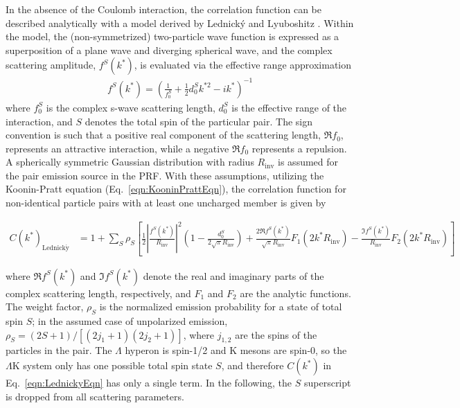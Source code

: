 \documentclass[ALICE,manyauthors]{cernphprep}
\newcommand{\Lam}{$\Lambda$\xspace}
\newcommand{\LamK}{$\Lambda$K\xspace}
\begin{document}
In the absence of the Coulomb interaction, the correlation function can be described analytically with a model derived by Lednick\'y and Lyuboshitz \cite{Lednicky:82}.
Within the model, the (non-symmetrized) two-particle wave function is expressed as a superposition of a plane wave and diverging spherical wave, and the complex scattering amplitude, $f^{S}(k^{*})$, is evaluated via the effective range approximation
\begin{equation}
\begin{aligned}
f^{S}(k^{*}) = \left( \frac{1}{f^{S}_{0}} + \frac{1}{2}d^{S}_{0}k^{*2} - ik^{*} \right)^{-1}
\end{aligned}
\label{eqn:ScatteringParam}
\end{equation}
where $f^{S}_{0}$ is the complex s-wave scattering length, $d^{S}_{0}$ is the effective range of the interaction, and $S$ denotes the total spin of the particular pair.
The sign convention is such that a positive real component of the scattering length, $\Re f_{0}$, represents an attractive interaction, while a negative $\Re f_{0}$ represents a repulsion.
A spherically symmetric Gaussian distribution with radius $R_{\mathrm{inv}}$  is assumed for the pair emission source in the PRF.
With these assumptions, utilizing the Koonin-Pratt equation (Eq.\ \ref{eqn:KooninPrattEqn}), the correlation function for non-identical particle pairs with at least one uncharged member is given by \cite{Lednicky:82}

\begin{equation}
\begin{aligned}
C(k^{*})_{\mathrm{Lednick\acute{y}}} &= 1 + \sum_{S}\rho_{S}\left[\frac{1}{2}\left|\frac{f^{S}(k^{*})}{R_{\mathrm{inv}}}\right|^2\left(1-\frac{d^{S}_{0}}{2\sqrt{\pi}R_{\mathrm{inv}}}\right)+\frac{2\Re f^{S}(k^{*})}{\sqrt{\pi}R_{\mathrm{inv}}}F_{1}(2k^{*}R_{\mathrm{inv}})-\frac{\Im f^{S}(k^{*})}{R_{\mathrm{inv}}}F_{2}(2k^{*}R_{\mathrm{inv}})\right]
\end{aligned}  
\label{eqn:LednickyEqn}
\end{equation}

where $\Re f^{S}(k^{*})$ and $\Im f^{S}(k^{*})$ denote the real and imaginary parts of the complex scattering length, respectively, and $F_{1}$ and $F_{2}$ are the analytic functions.
The weight factor, $\rho_{S}$ is the normalized emission probability for a state of total spin $S$; in the assumed case of unpolarized emission, $\rho_{S} = (2S+1)/[(2j_{1}+1)(2j_{2}+1)]$, where $j_{1,2}$ are the spins of the particles in the pair.
The \Lam hyperon is spin-1/2 and K mesons are spin-0, so the \LamK system only has one possible total spin state $S$, and therefore $C(k^{*})$ in Eq.\ \ref{eqn:LednickyEqn} has only a single term.
In the following, the $S$ superscript is dropped from all scattering parameters.
\end{document}

